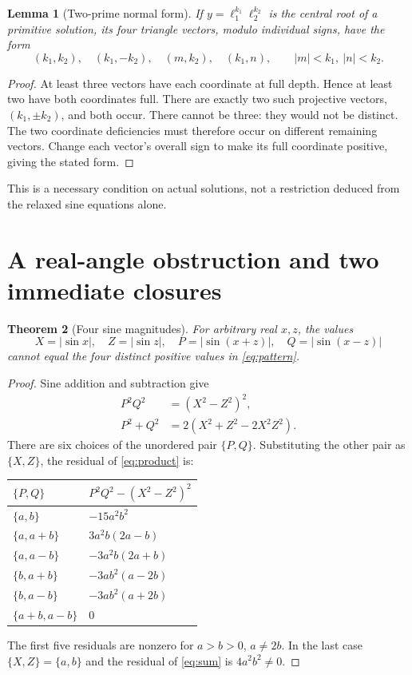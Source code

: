\documentclass[11pt]{article}
\newtheorem{theorem}{Theorem}[section]
\newtheorem{lemma}[theorem]{Lemma}
\theoremstyle{definition}\newtheorem{definition}[theorem]{Definition}
\theoremstyle{remark}\newtheorem{remark}[theorem]{Remark}
\begin{document}
\begin{lemma}[Two-prime normal form]\label{lem:two}
If $y=\ell_1^{k_1}\ell_2^{k_2}$ is the central root of a primitive solution, its four triangle vectors, modulo individual signs, have the form
\[
(k_1,k_2),\quad(k_1,-k_2),\quad(m,k_2),\quad(k_1,n),
\qquad |m|<k_1,\ |n|<k_2.
\]
\end{lemma}
\begin{proof}
At least three vectors have each coordinate at full depth. Hence at least two have both coordinates full. There are exactly two such projective vectors, $(k_1,\pm k_2)$, and both occur. There cannot be three: they would not be distinct. The two coordinate deficiencies must therefore occur on different remaining vectors. Change each vector's overall sign to make its full coordinate positive, giving the stated form.
\end{proof}
This is a necessary condition on actual solutions, not a restriction deduced from the relaxed sine equations alone.

\section{A real-angle obstruction and two immediate closures}\label{sec:real}
\begin{theorem}[Four sine magnitudes]\label{thm:real}
For arbitrary real $x,z$, the values
\[
X=|\sin x|,\quad Z=|\sin z|,\quad
P=|\sin(x+z)|,\quad Q=|\sin(x-z)|
\]
cannot equal the four distinct positive values in \eqref{eq:pattern}.
\end{theorem}
\begin{proof}
Sine addition and subtraction give
\begin{align}
P^2Q^2&=(X^2-Z^2)^2,\label{eq:product}\\
P^2+Q^2&=2(X^2+Z^2-2X^2Z^2).\label{eq:sum}
\end{align}
There are six choices of the unordered pair $\{P,Q\}$. Substituting the other pair as $\{X,Z\}$, the residual of \eqref{eq:product} is:
\begin{center}
\begin{tabular}{ll}
\toprule
$\{P,Q\}$ & $P^2Q^2-(X^2-Z^2)^2$\\
\midrule
$\{a,b\}$ & $-15a^2b^2$\\
$\{a,a+b\}$ & $3a^2b(2a-b)$\\
$\{a,a-b\}$ & $-3a^2b(2a+b)$\\
$\{b,a+b\}$ & $-3ab^2(a-2b)$\\
$\{b,a-b\}$ & $-3ab^2(a+2b)$\\
$\{a+b,a-b\}$ & $0$\\
\bottomrule
\end{tabular}
\end{center}
The first five residuals are nonzero for $a>b>0$, $a\ne2b$. In the last case $\{X,Z\}=\{a,b\}$ and the residual of \eqref{eq:sum} is $4a^2b^2\ne0$.
\end{proof}
\end{document}
